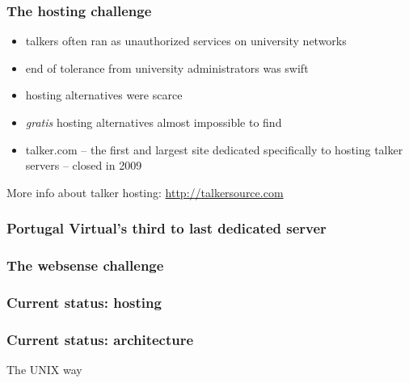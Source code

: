 \documentclass[aspectratio=169]{beamer}
\begin{document}
\begin{frame}
\frametitle{The hosting challenge}
  \begin{itemize}
    \item{} talkers often ran as unauthorized services on university networks
    \item{} end of tolerance from university administrators was swift
    \item{} hosting alternatives were scarce
    \item{} \emph{gratis} hosting alternatives almost impossible to find
    \item{} talker.com -- the first and largest site dedicated specifically to hosting talker servers -- closed in 2009
  \end{itemize}
  More info about talker hosting: \url{http://talkersource.com}
\end{frame}

\begin{frame}
\frametitle{Portugal Virtual's third to last dedicated server}
\end{frame}


\begin{frame}
\frametitle{The websense challenge}
\end{frame}

\begin{frame}
\frametitle{Current status: hosting}
\end{frame}

\begin{frame}
\frametitle{Current status: architecture}
The UNIX way
\end{frame}
\end{document}

